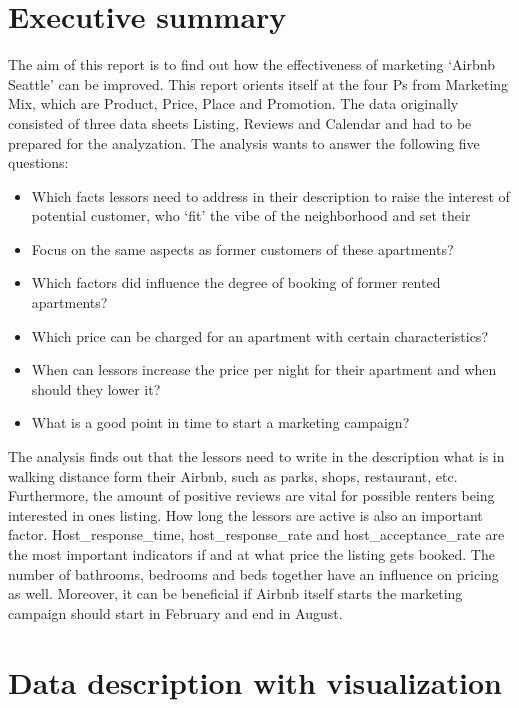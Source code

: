 \documentclass[journal]{IEEEtran}
\begin{document}
\section{Executive summary} 
\noindent 
The aim of this report is to find out how the effectiveness of marketing ‘Airbnb Seattle’ can be improved. This report orients itself at the four Ps from Marketing Mix, which are Product, Price, Place and Promotion. 
The data originally consisted of three data sheets Listing, Reviews and Calendar and had to be prepared for the analyzation. 
The analysis wants to answer the following five questions: 

\begin{itemize}
\item Which facts lessors need to address in their description to raise the interest of potential customer, who ‘fit’ the vibe of the neighborhood and set their
\item Focus on the same aspects as former customers of these apartments?
\item Which factors did influence the degree of booking of former rented apartments? 
\item Which price can be charged for an apartment with certain characteristics?
\item When can lessors increase the price per night for their apartment and when should they lower it?
\item What is a good point in time to start a marketing campaign?
\end{itemize}
The analysis finds out that the lessors need to write in the description what is in walking distance form their Airbnb, such as parks, shops, restaurant, etc.
Furthermore, the amount of positive reviews are vital for possible renters being interested in ones listing. How long the lessors are active is also an important factor. 
Host\_response\_time, host\_response\_rate and host\_acceptance\_rate are the most important indicators if and at what price the listing gets booked. The number of bathrooms, bedrooms and beds together have an influence on pricing as well. 
Moreover, it can be beneficial if Airbnb itself starts the marketing campaign should start in February and end in August. 


\section{Data description with visualization}
\end{document}
